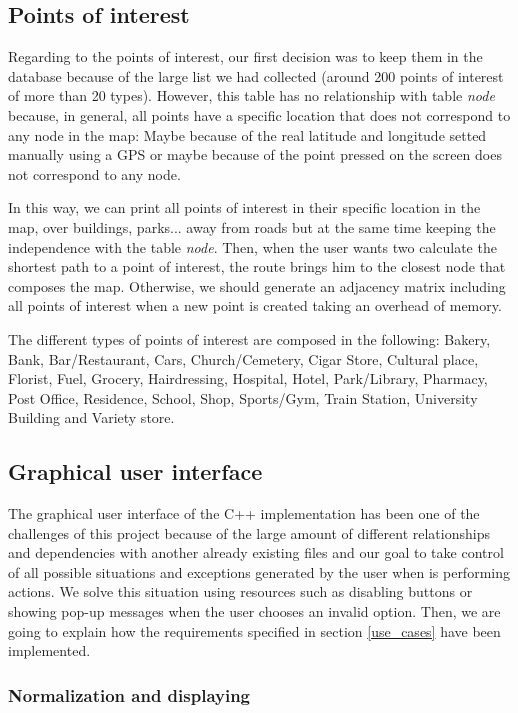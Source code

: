 \documentclass{article}
\begin{document}
\subsection{Points of interest}
Regarding to the points of interest, our first decision was to keep them in the database because of the large list we had collected (around 200 points of interest of more than 20 types). However, this table has no relationship with table \textit{node} because, in general, all points have a specific location that does not correspond to any node in the map: Maybe because of the real latitude and longitude setted manually using a GPS or maybe because of the point pressed on the screen does not correspond to any node.

In this way, we can print all points of interest in their specific location in the map, over buildings, parks... away from roads but at the same time keeping the independence with the table \textit{node}. Then, when the user wants two calculate the shortest path to a point of interest, the route brings him to the closest node that composes the map. Otherwise, we should generate an adjacency matrix including all points of interest when a new point is created taking an overhead of memory.

The different types of points of interest are composed in the following: Bakery, Bank, Bar/Restaurant, Cars, Church/Cemetery, Cigar Store, Cultural place, Florist, Fuel, Grocery, Hairdressing, Hospital, Hotel, Park/Library, Pharmacy, Post Office, Residence, School, Shop, Sports/Gym, Train Station, University Building and Variety store.

\subsection{Graphical user interface}
The graphical user interface of the C++ implementation has been one of the challenges of this project because of the large amount of different relationships and dependencies with another already existing files and our goal to take control of all possible situations and exceptions generated by the user when is performing actions. We solve this situation using resources such as disabling buttons or showing pop-up messages when the user chooses an invalid option. Then, we are going to explain how the requirements specified in section \ref{use_cases} have been implemented.

\subsubsection{Normalization and displaying}
\end{document}

